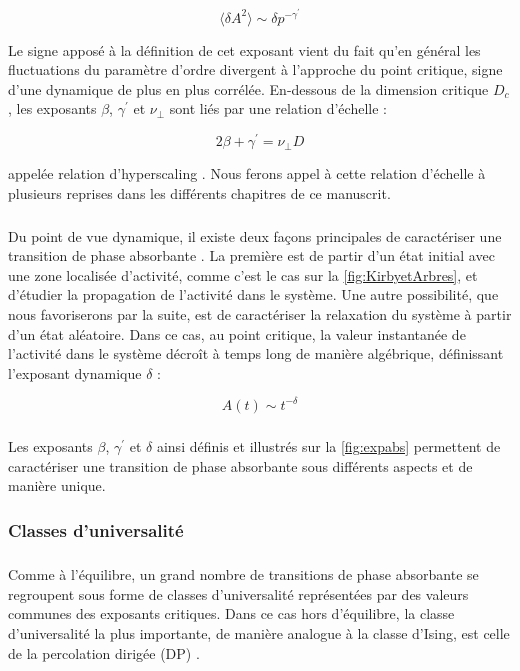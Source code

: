 \begin{equation}
	\langle \delta A^2\rangle \sim \delta p^{-\gamma^\prime}
\end{equation}

\noindent Le signe apposé à la définition de cet exposant vient du fait qu'en général les fluctuations du paramètre d'ordre divergent à l'approche du point critique, signe d'une dynamique de plus en plus corrélée. En-dessous de la dimension critique $D_c$, les exposants $\beta$, $\gamma^\prime$ et $\nu_\perp$ sont liés par une relation d'échelle :

\begin{equation}
	2\beta + \gamma^\prime = \nu_\perp D
\end{equation}

\noindent appelée relation d'hyperscaling \cite{lubeck_universal_2004}. Nous ferons appel à cette relation d'échelle à plusieurs reprises dans les différents chapitres de ce manuscrit.

\subparagraph{}Du point de vue dynamique, il existe deux façons principales de caractériser une transition de phase absorbante \cite{lubeck_universal_2004}. La première est de partir d'un état initial avec une zone localisée d'activité, comme c'est le cas sur la \autoref{fig:KirbyetArbres}, et d'étudier la propagation de l'activité dans le système. Une autre possibilité, que nous favoriserons par la suite, est de caractériser la relaxation du système à partir d'un état aléatoire. Dans ce cas, au point critique, la valeur instantanée de l'activité dans le système décroît à temps long de manière algébrique, définissant l'exposant dynamique $\delta$ :

\begin{equation}
	A(t) \sim t^{-\delta}
\end{equation}

\subparagraph{}Les exposants $\beta$, $\gamma^\prime$ et $\delta$ ainsi définis et illustrés sur la \autoref{fig:expabs} permettent de caractériser une transition de phase absorbante sous différents aspects et de manière unique. 

\subsubsection{Classes d'universalité}

\subparagraph{}Comme à l'équilibre, un grand nombre de transitions de phase absorbante se regroupent sous forme de classes d'universalité représentées par des valeurs communes des exposants critiques. Dans ce cas hors d'équilibre, la classe d'universalité la plus importante, de manière analogue à la classe d'Ising, est celle de la percolation dirigée (DP) \cite{hinrichsen_non_equilibrium_2000,lubeck_universal_2004}. 

